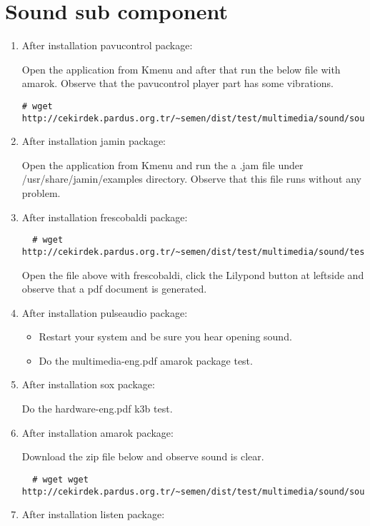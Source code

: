 \documentclass[a4paper,10pt]{article}
\begin{document}
\section{Sound sub component}
\begin{enumerate}
\item After installation pavucontrol package:

Open the application from Kmenu and after that run the below file with amarok. Observe that the pavucontrol player part has some vibrations.

\begin{verbatim}
# wget http://cekirdek.pardus.org.tr/~semen/dist/test/multimedia/sound/sound/music.mp3 
\end{verbatim}

\item After installation jamin package:

Open the application from Kmenu and run the a .jam file under /usr/share/jamin/examples directory. Observe that this file runs without any problem.

\item After installation frescobaldi package:
 \begin{verbatim}
  # wget http://cekirdek.pardus.org.tr/~semen/dist/test/multimedia/sound/test_frescobaldi.ly
 \end{verbatim}
Open the file above with frescobaldi, click the Lilypond button at leftside and observe that a pdf document is generated.
\item After installation pulseaudio package:
\begin{itemize}
 \item Restart your system and be sure you hear opening sound.
 \item Do the multimedia-eng.pdf amarok package test.
\end{itemize}
\item After installation sox package:

Do the hardware-eng.pdf k3b test.
\item After installation amarok package:
 
Download the zip file below and observe sound is clear.
 \begin{verbatim}
  # wget wget http://cekirdek.pardus.org.tr/~semen/dist/test/multimedia/sound/sound.tar
 \end{verbatim}

\item After installation listen package: 


\end{enumerate}
\end{document}
